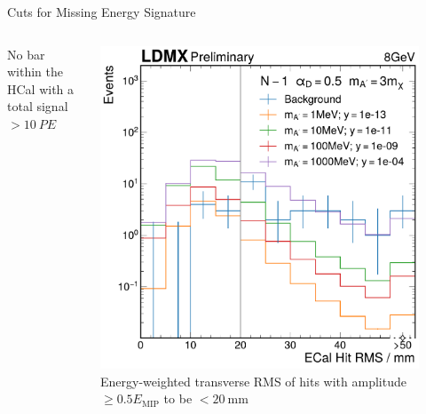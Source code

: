\documentclass[aspectratio=169]{beamer}
\begin{document}
\begin{frame}[t]{Cuts for Missing Energy Signature}
\begin{columns}[t]
\begin{column}{0.32\textwidth}
      {
        \footnotesize
        No bar within the HCal with a total signal $> \qty{10}{PE}$
      }
    \end{column}
    \begin{column}{0.32\textwidth}
      \centering
      \includegraphics[width=0.9\textwidth]{../figures/ldmx/analysis/nm1-ecal-rms-8gev-1e13norm.pdf}
      {
        \footnotesize
        Energy-weighted transverse RMS of hits with amplitude $\geq 0.5E_\mathrm{MIP}$
        to be $<\qty{20}{\mm}$
      }
    \end{column}
  \end{columns}
\end{frame}
\end{document}
